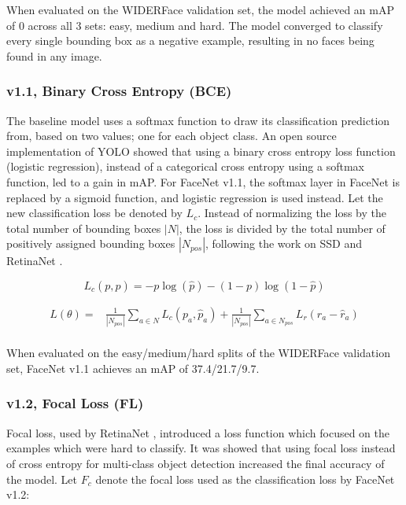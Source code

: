 \documentclass[a4paper, twoside]{article}
\begin{document}
When evaluated on the WIDERFace validation set, the model achieved an mAP of 0 across all 3 sets: easy, medium and hard. The model converged to classify every single bounding box as a negative example, resulting in no faces being found in any image.

\subsubsection{v1.1, Binary Cross Entropy (BCE)}
The baseline model uses a softmax function to draw its classification prediction from, based on two values; one for each object class. An open source implementation of YOLO \cite{sigmoidvssoftmax} showed that using a binary cross entropy loss function (logistic regression), instead of a categorical cross entropy using a softmax function, led to a gain in mAP. For FaceNet v1.1, the softmax layer in FaceNet is replaced by a sigmoid function, and logistic regression is used instead. Let the new classification loss be denoted by $L_c$. Instead of normalizing the loss by the total number of bounding boxes $|N|$, the loss is divided by the total number of positively assigned bounding boxes $|N_{pos}|$, following the work on SSD \cite{ssd} and RetinaNet \cite{retinanet}.

\begin{equation}
L_c(p, \hat{p}) = -p \log{(\hat{p})} -(1-p) \log{(1-\hat{p})}
\end{equation}

\begin{equation}
\begin{split}
	L(\theta) = &  \frac{1}{|N_{pos}|} \sum_{a \in N} L_c(p_a, \hat{p}_a) 
	 + \frac{1}{|N_{pos}|} \sum_{a \in N_{pos}} L_r(r_a - \hat{r}_a)  \\ 
\end{split}
\end{equation}

When evaluated on the easy/medium/hard splits of the WIDERFace validation set, FaceNet v1.1 achieves an mAP of 37.4/21.7/9.7. 

\subsubsection{v1.2, Focal Loss (FL)}
Focal loss, used by RetinaNet \cite{retinanet}, introduced a loss function which focused on the examples which were hard to classify. It was showed that using focal loss instead of cross entropy for multi-class object detection increased the final accuracy of the model. Let $F_c$ denote the focal loss used as the classification loss by FaceNet v1.2:
\end{document}
